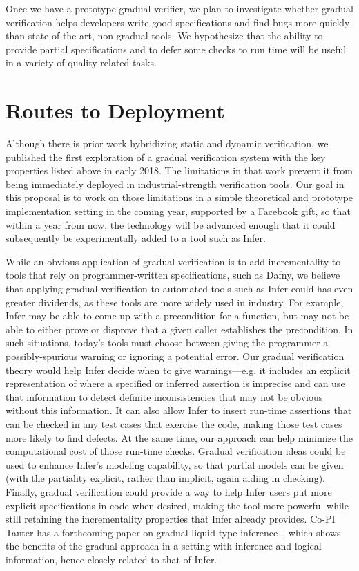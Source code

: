 \documentclass[10pt,twocolumn]{article}
\begin{document}
\begin{sloppypar}
Once we have a prototype gradual verifier, we plan to investigate whether gradual verification helps developers write good specifications and find bugs more quickly than state of the art, non-gradual tools.
We hypothesize that the ability to provide partial specifications and to defer some checks to run time will be useful in a variety of quality-related tasks.

\section{Routes to Deployment}
\vspace{-2ex}

Although there is prior work hybridizing static and dynamic verification, we published the first exploration of a gradual verification system with the key properties listed above in early 2018. The limitations in that work prevent it from being immediately deployed in industrial-strength verification tools.  Our goal in this proposal is to work on those limitations in a simple theoretical and prototype implementation setting in the coming year, supported by a Facebook gift, so that within a year from now, the technology will be advanced enough that it could subsequently be experimentally added to a tool such as Infer.

While an obvious application of gradual verification is to add incrementality to tools that rely on programmer-written specifications, such as Dafny, we believe that applying gradual verification to automated tools such as Infer could has even greater dividends, as these tools are more widely used in industry. For example, Infer may be able to come up with a precondition for a function, but may not be able to either prove or disprove that a given caller establishes the precondition.  In such situations, today's tools must choose between giving the programmer a possibly-spurious warning or ignoring a potential error. Our gradual verification theory would help Infer decide when to give warnings---e.g. it includes an explicit representation of where a specified or inferred assertion is imprecise and can use that information to detect definite inconsistencies that may not be obvious without this information. It can also allow Infer to insert run-time assertions that can be checked in any test cases that exercise the code, making those test cases more likely to find defects.  At the same time, our approach can help minimize the computational cost of those run-time checks. Gradual verification ideas could be used to enhance Infer's modeling capability, so that partial models can be given (with the partiality explicit, rather than implicit, again aiding in checking). Finally, gradual verification could provide a way to help Infer users put more explicit specifications in code when desired, making the tool more powerful while still retaining the incrementality properties that Infer already provides.
Co-PI Tanter has a forthcoming paper on gradual liquid type inference~\cite{vazouAl:oopsla2018}, which shows the benefits of the gradual approach in a setting with inference and logical information, hence closely related to that of Infer.


\end{sloppypar}
\end{document}
